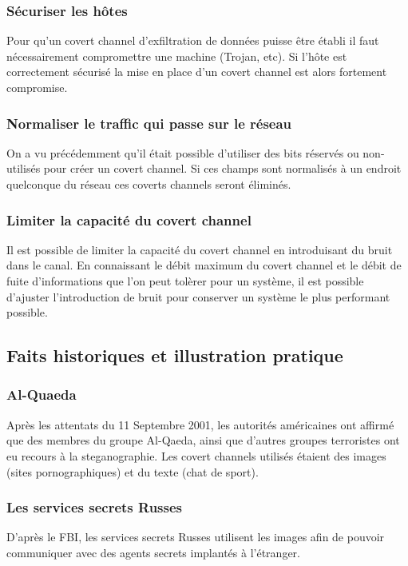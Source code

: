 \documentclass{acm_proc_article-sp}
\begin{document}
\subsubsection{Sécuriser les hôtes}
Pour qu'un covert channel d'exfiltration de données puisse être établi il faut nécessairement compromettre une machine (Trojan, etc). Si l'hôte est correctement sécurisé la mise en place d'un covert channel est alors fortement compromise.

\subsubsection{Normaliser le traffic qui passe sur le réseau}
On a vu précédemment qu'il était possible d'utiliser des bits réservés ou non-utilisés pour créer un covert channel. Si ces champs sont normalisés à un endroit quelconque du réseau ces coverts channels seront éliminés.

\subsubsection{Limiter la capacité du covert channel}
Il est possible de limiter la capacité du covert channel en introduisant du bruit dans le canal. En connaissant le débit maximum du covert channel et le débit de fuite d'informations que l'on peut tolèrer pour un système, il est possible d'ajuster l'introduction de bruit pour conserver un système le plus performant possible.

\subsection{Faits historiques et illustration pratique}
\subsubsection{Al-Quaeda}
Après les attentats du 11 Septembre 2001, les autorités américaines ont affirmé que des membres du groupe Al-Qaeda, ainsi que d'autres groupes terroristes ont eu recours à la steganographie. Les covert channels utilisés étaient des images (sites pornographiques) et du texte (chat de sport).

\subsubsection{Les services secrets Russes}
D'après le FBI, les services secrets Russes utilisent les images afin de pouvoir communiquer avec des agents secrets implantés à l'étranger.
\end{document}
